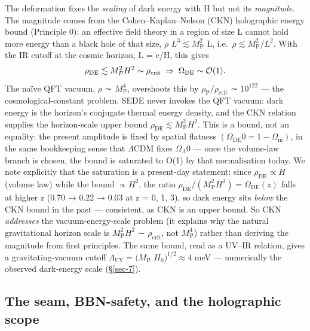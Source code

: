 \documentclass[preprint,12pt]{elsarticle}
\begin{document}
The deformation fixes the \emph{scaling} of dark energy with H but not
its \emph{magnitude}. The magnitude comes from the Cohen--Kaplan--Nelson
(CKN) holographic energy bound (Principle 0): an effective field theory
in a region of size L cannot hold more energy than a black hole of that
size, \(\rho\) \(L^{3} \lesssim  M_{\mathrm{P}}^{2}\) L,
i.e.~\(\rho  \lesssim  M_{\mathrm{P}}^{2}/L^{2}\). With the IR cutoff at
the cosmic horizon, L = c/H, this gives
\begin{equation}\rho_{\rm DE} \lesssim M_P^2 H^2 \sim \rho_{\rm crit} \;\Rightarrow\; \Omega_{\rm DE} \sim \mathcal{O}(1).\end{equation}
The naïve QFT vacuum, \(\rho\) ∼ \(M_{\mathrm{P}}^{4}\), overshoots this
by \(\rho _{\mathrm{P}}/\rho _{\mathrm{crit}}\) ∼ \(10^{122}\) --- the
cosmological-constant problem. SEDE never invokes the QFT vacuum: dark
energy is the horizon's conjugate thermal energy density, and the CKN
relation supplies the horizon-scale upper bound
\(\rho _\mathrm{DE} \lesssim  M_{\mathrm{P}}^{2}H^{2}\). This is a
bound, not an equality: the present amplitude is fixed by spatial
flatness \((\Omega _\mathrm{DE}0 = 1 - \Omega _{\mathrm{m}})\), in the
same bookkeeping sense that \(\Lambda \mathrm{CDM}\) fixes
\(\Omega _\Lambda 0\) --- once the volume-law branch is chosen, the
bound is saturated to O(1) by that normalisation today. We note
explicitly that the saturation is a present-day statement: since
\(\rho _\mathrm{DE} \propto  H\) (volume law) while the bound
\(\propto  H^{2}\), the ratio
\(\rho _\mathrm{DE}/(M_{\mathrm{P}}^{2}H^{2}) = \Omega _\mathrm{DE}(z)\)
falls at higher z (0.70 → 0.22 → 0.03 at z = 0, 1, 3), so dark energy
sits \emph{below} the CKN bound in the past --- consistent, as CKN is an
upper bound. So CKN \emph{addresses} the vacuum-energy-scale problem (it
explains why the natural gravitational horizon scale is
\(M_{\mathrm{P}}^{2}H^{2}\) ∼ \(\rho _{\mathrm{crit}}\), not
\(M_{\mathrm{P}}^{4}\)) rather than deriving the magnitude from first
principles. The same bound, read as a UV--IR relation, gives a
gravitating-vacuum cutoff \(\Lambda _\mathrm{UV} = (M_{\mathrm{P}}\)
\(H_{0})^{1/2} \approx  4\) meV --- numerically the observed dark-energy
scale (§\ref{sec-7}).

\subsection{The seam, BBN-safety, and the holographic
scope}\label{sec-8-3}
\end{document}
